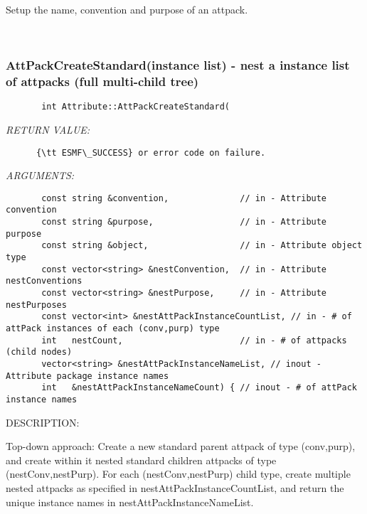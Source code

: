        Setup the name, convention and purpose of an attpack.
   
 
\mbox{}\hrulefill\
 
\subsubsection [AttPackCreateStandard(instance] {AttPackCreateStandard(instance list) - nest a instance list of attpacks (full multi-child tree)}


  
\begin{verbatim}       int Attribute::AttPackCreateStandard(\end{verbatim}{\em RETURN VALUE:}
\begin{verbatim}      {\tt ESMF\_SUCCESS} or error code on failure.
   \end{verbatim}{\em ARGUMENTS:}
\begin{verbatim}       const string &convention,              // in - Attribute convention
       const string &purpose,                 // in - Attribute purpose
       const string &object,                  // in - Attribute object type
       const vector<string> &nestConvention,  // in - Attribute nestConventions
       const vector<string> &nestPurpose,     // in - Attribute nestPurposes
       const vector<int> &nestAttPackInstanceCountList, // in - # of attPack instances of each (conv,purp) type
       int   nestCount,                       // in - # of attpacks (child nodes)
       vector<string> &nestAttPackInstanceNameList, // inout - Attribute package instance names
       int   &nestAttPackInstanceNameCount) { // inout - # of attPack instance names
   \end{verbatim}
{\sf DESCRIPTION:\\ }


       Top-down approach:  Create a new standard parent attpack of type
       (conv,purp), and create within it nested standard children attpacks of 
       type (nestConv,nestPurp).  For each (nestConv,nestPurp) child type, 
       create multiple nested attpacks as specified in 
       nestAttPackInstanceCountList, and return the unique instance names in
       nestAttPackInstanceNameList.
   
 
\mbox{}\hrulefill\
 
